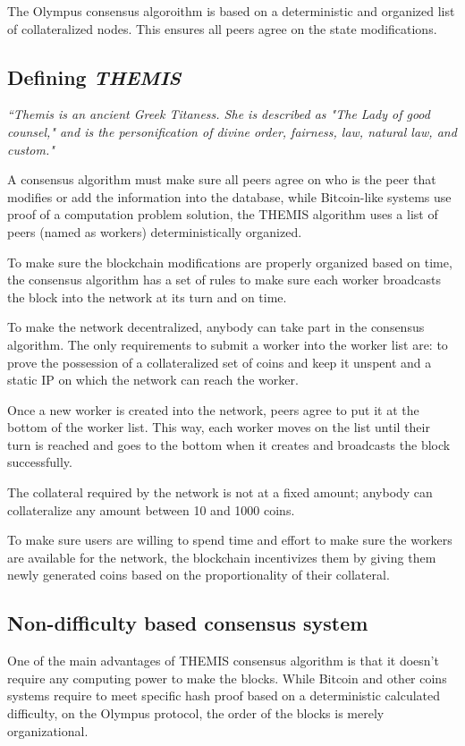 \documentclass{article}
\begin{document}
	The Olympus consensus algoroithm is based on a deterministic and organized list of collateralized nodes. This ensures all peers agree on the state modifications.
	
	\subsection{Defining \textit{THEMIS}}	

	\textit{	``Themis is an ancient Greek Titaness. She is described as "The Lady of good counsel," and is the personification of divine order, fairness, law, natural law, and custom."}
	
	A consensus algorithm must make sure all peers agree on who is the peer that modifies or add the information into the database, while Bitcoin-like systems use proof of a computation problem solution, the THEMIS algorithm uses a list of peers (named as workers) deterministically organized.
	
	To make sure the blockchain modifications are properly organized based on time, the consensus algorithm has a set of rules to make sure each worker broadcasts the block into the network at its turn and on time.
	
	To make the network decentralized, anybody can take part in the consensus algorithm. The only requirements to submit a worker into the worker list are: to prove the possession of a collateralized set of coins and keep it unspent and a static IP on which the network can reach the worker.
	
	Once a new worker is created into the network, peers agree to put it at the bottom of the worker list. This way, each worker moves on the list until their turn is reached and goes to the bottom when it creates and broadcasts the block successfully.
	
	The collateral required by the network is not at a fixed amount; anybody can collateralize any amount between 10 and 1000 coins.
	
	To make sure users are willing to spend time and effort to make sure the workers are available for the network, the blockchain incentivizes them by giving them newly generated coins based on the proportionality of their collateral.
		
	\subsection{Non-difficulty based consensus system}
	
	One of the main advantages of THEMIS consensus algorithm is that it doesn't require any computing power to make the blocks. While Bitcoin and other coins systems require to meet specific hash proof based on a deterministic calculated difficulty, on the Olympus protocol, the order of the blocks is merely organizational.
	
\end{document}
